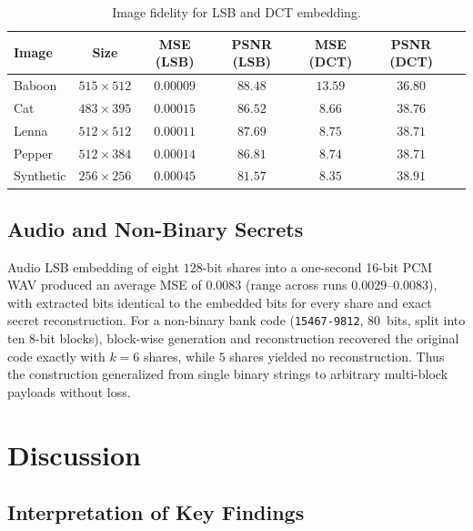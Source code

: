 \documentclass[runningheads]{llncs}
\begin{document}
\begin{table}[t]
\centering
\small
\setlength{\tabcolsep}{4pt}
\caption{Image fidelity for LSB and DCT embedding.}
\label{tab:fidelity}
\begin{tabular}{lcccccc}
\toprule
Image & Size & MSE (LSB) & PSNR (LSB) & MSE (DCT) & PSNR (DCT)\\
\midrule
Baboon   & $515\times512$ & $0.00009$ & $88.48$ & $13.59$ & $36.80$\\
Cat      & $483\times395$ & $0.00015$ & $86.52$ & $8.66$  & $38.76$\\
Lenna    & $512\times512$ & $0.00011$ & $87.69$ & $8.75$  & $38.71$\\
Pepper   & $512\times384$ & $0.00014$ & $86.81$ & $8.74$  & $38.71$\\
Synthetic& $256\times256$ & $0.00045$ & $81.57$ & $8.35$  & $38.91$\\
\bottomrule
\end{tabular}
\end{table}

\subsection{Audio and Non-Binary Secrets}

Audio LSB embedding of eight $128$-bit shares into a one-second 16-bit PCM WAV
produced an average MSE of $0.0083$ (range across runs $0.0029$--$0.0083$), with
extracted bits identical to the embedded bits for every share and exact secret
reconstruction. For a non-binary bank code (\texttt{15467-9812}, $80$~bits,
split into ten $8$-bit blocks), block-wise generation and reconstruction
recovered the original code exactly with $k = 6$ shares, while $5$ shares
yielded no reconstruction. Thus the construction generalized from single binary
strings to arbitrary multi-block payloads without loss.

\section{Discussion}
\label{sec:discussion}

\subsection{Interpretation of Key Findings}
\end{document}
